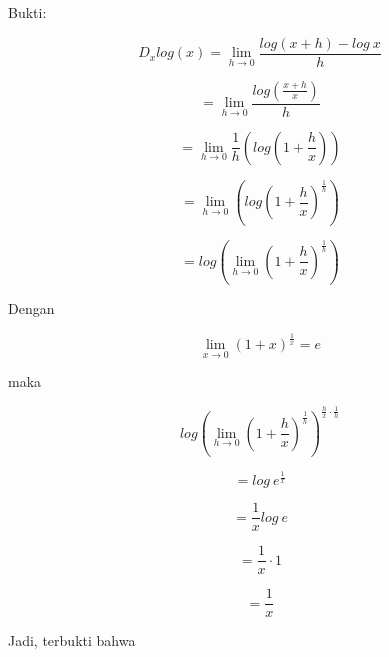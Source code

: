 \documentclass{article}
\begin{document}
\begin{eulernotebook}
\begin{eulercomment}
\begin{eulercomment}
\begin{eulercomment}
Bukti:\\
\end{eulercomment}
\begin{eulerformula}
\[
D_xlog(x)=\lim_{h\to 0} \frac{log(x+h)-log\ x}{h}
\]
\end{eulerformula}
\begin{eulerformula}
\[
=\lim_{h\to 0} \frac{log\left (\frac{x+h}{x}\right )}{h}
\]
\end{eulerformula}
\begin{eulerformula}
\[
=\lim_{h\to 0} \frac{1}{h}\left (log\left (1+\frac{h}{x}\right )\right )
\]
\end{eulerformula}
\begin{eulerformula}
\[
=\lim_{h\to 0} \left (log\left (1+\frac{h}{x}\right )^{\frac{1}{h}}\right )
\]
\end{eulerformula}
\begin{eulerformula}
\[
= log\left (\lim_{h\to 0}\left (1+\frac{h}{x}\right )^{\frac{1}{h}}\right )
\]
\end{eulerformula}
\begin{eulercomment}
Dengan\\
\end{eulercomment}
\begin{eulerformula}
\[
\lim_{x\to 0} (1+x)^{\frac{1}{x}}=e
\]
\end{eulerformula}
\begin{eulercomment}
maka\\
\end{eulercomment}
\begin{eulerformula}
\[
log\left (\lim_{h\to 0}\left (1+\frac{h}{x}\right )^{\frac{1}{h}}\right )^{\frac{h}{x}\cdot \frac{1}{h}}
\]
\end{eulerformula}
\begin{eulerformula}
\[
= log\ e^{\frac{1}{x}}
\]
\end{eulerformula}
\begin{eulerformula}
\[
=\frac{1}{x}log\ e
\]
\end{eulerformula}
\begin{eulerformula}
\[
=\frac{1}{x}\cdot 1
\]
\end{eulerformula}
\begin{eulerformula}
\[
=\frac{1}{x}
\]
\end{eulerformula}
\begin{eulercomment}
Jadi, terbukti bahwa\\
\end{eulercomment}
\begin{eulerformula}

\end{eulerformula}
\end{eulercomment}
\end{eulercomment}
\end{eulernotebook}
\end{document}
